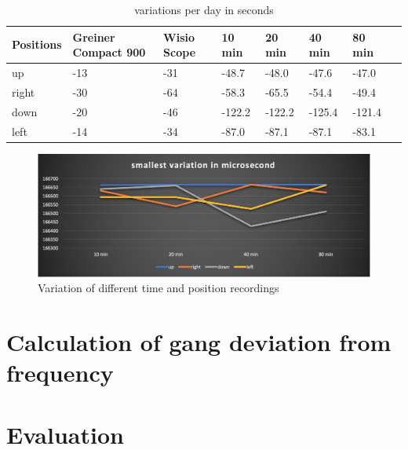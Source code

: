 \documentclass[12pt, a4paper]{report}
\begin{document}
    \begin{table}
      \centering
        \begin{tabularx}{\linewidth}{ |L|L|L|L|L|L|L|L|  }
        \hline
        {\fontsize{10}{12}\selectfont \textbf{Positions}} &{\fontsize{9}{10}\selectfont \textbf{Greiner Compact 900}} & {\fontsize{10}{12}\selectfont \textbf{Wisio Scope}} & {\fontsize{10}{12}\selectfont \textbf{10 min}} &  {\fontsize{10}{12}\selectfont \textbf{20 min}} &  {\fontsize{10}{12}\selectfont \textbf{40 min}} & {\fontsize{10}{12}\selectfont  \textbf{80 min}} \\ \hline
        up        & -13                 &      -31  & -48.7     & -48.0     & -47.6      & -47.0      \\ \hline
        right     & -30                 &      -64  & -58.3      & -65.5    & -54.4      & -49.4      \\ \hline
        down      & -20               &  -46  & -122.2    & -122.2     & -125.4    & -121.4      \\ \hline
        left      & -14                & -34 & -87.0	   & -87.1	  & -87.1	  & -83.1      \\ \hline
        \end{tabularx}
          \caption{ variations per day in seconds} 
    \end{table}
    
    \noindent
    \begin{figure}[H]
    \includegraphics[scale=0.5]{Images/smallest_variation.png}
    
    \caption{ Variation of different time and position recordings}
    \end{figure} 
    
    \section{Calculation of gang deviation from frequency}
    
    \section{Evaluation}
    
    
    \glsaddall
    \printglossaries

\printbibliography
        
    \listoffigures
    \bigskip
    
    
    
    
\end{document}
